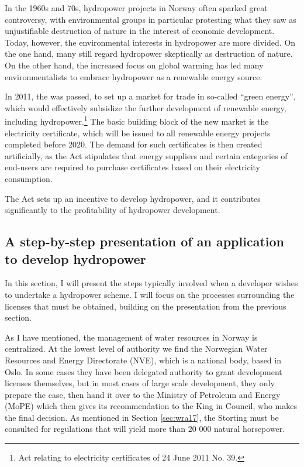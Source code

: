 In the 1960s and 70s, hydropower projects in Norway often sparked great controversy, with environmental groups in particular protesting what they saw as unjustifiable destruction of nature in the interest of economic development. Today, however, the environmental interests in hydropower are more divided. On the one hand, many still regard hydropower skeptically as destruction of nature. On the other hand, the increased focus on global warming has led many environmentalists to embrace hydropower as a renewable energy source.

In 2011, the \cite{eca11} was passed, to set up a market for trade in so-called ``green energy'', which would effectively subsidize the further development of renewable energy, including hydropower.\footnote{Act relating to electricity certificates of
24 June 2011 No. 39.} The basic building block of the new market is the electricity certificate, which will be issued to all renewable energy projects completed before 2020. The demand for such certificates is then created artificially, as the Act stipulates that energy suppliers and certain categories of end-users are required to purchase certificates based on their electricity consumption. 

The Act sets up an incentive to develop hydropower, and it contributes significantly to the profitability of hydropower development.

\subsection{A step-by-step presentation of an application to develop hydropower}

In this section, I will present the steps typically involved when a developer wishes to undertake a hydropower scheme. I will focus on the processes surrounding the licenses that must be obtained, building on the presentation from the previous section.

As I have mentioned, the management of water resources in Norway is centralized. At the lowest level of authority we find the Norwegian Water Resources and Energy Directorate (NVE), which is a national body, based in Oslo. In some cases they have been delegated authority to grant development licenses themselves, but in most cases of large scale development, they only prepare the case, then hand it over to the Ministry of Petroleum and Energy (MoPE) which then gives its recommendation to the King in Council, who makes the final decision. As mentioned in Section \ref{sec:wra17}, the Storting must be consulted for regulations that will yield more than 20 000 natural horsepower. 

